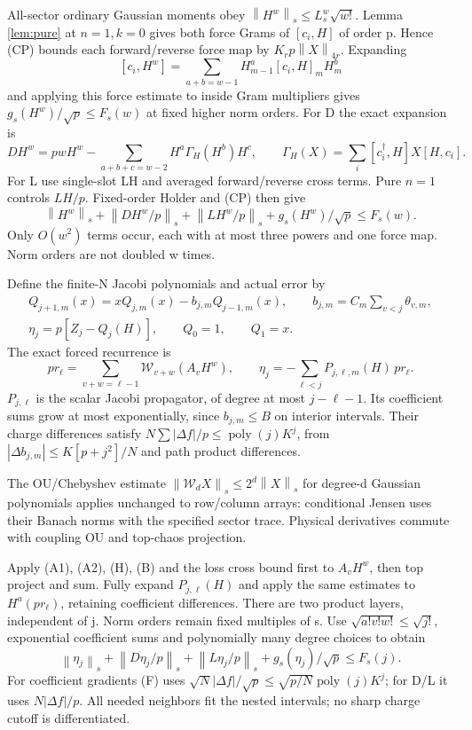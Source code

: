 \documentclass[11pt]{article}
\newcommand{\Wick}{\mathcal W}
\newcommand{\norm}[1]{\left\lVert#1\right\rVert}
\begin{document}
All-sector ordinary Gaussian moments obey
$\norm{H^w}_s\le L_s^w\sqrt{w!}$. Lemma \ref{lem:pure} at
$n=1,k=0$ gives both force Grams of $[c_i,H]$ of order p.
Hence (CP) bounds each forward/reverse force map by
$K_rp\norm X_{4r}$. Expanding
\[
 [c_i,H^w]=\sum_{a+b=w-1}H_{m-1}^a[c_i,H]_mH_m^b
\]
and applying this force estimate to inside Gram multipliers
gives $g_s(H^w)/\sqrt p\le F_s(w)$ at fixed higher norm orders.
For D the exact expansion is
\[
 DH^w=pwH^w-\sum_{a+b+c=w-2}H^a\Gamma_H(H^b)H^c,\qquad
 \Gamma_H(X)=\sum_i[c_i^\dagger,H]X[H,c_i].
\]
For L use single-slot LH and averaged forward/reverse cross
terms. Pure $n=1$ controls $LH/p$. Fixed-order Holder and (CP)
then give
\[
 \norm{H^w}_s+\norm{DH^w/p}_s+\norm{LH^w/p}_s
              +g_s(H^w)/\sqrt p\le F_s(w). \tag{H}
\]
Only $O(w^2)$ terms occur, each with at most three powers and
one force map. Norm orders are not doubled w times.

Define the finite-N Jacobi polynomials and actual error by
\begin{gather*}
 Q_{j+1,m}(x)=xQ_{j,m}(x)-b_{j,m}Q_{j-1,m}(x),
 \qquad b_{j,m}=C_m\sum_{v<j}\theta_{v,m},\\
 \eta_j=p[Z_j-Q_j(H)],\qquad Q_0=1,\qquad Q_1=x.
\end{gather*}
The exact forced recurrence \cite{charged} is
\[
 p r_\ell=\sum_{v+w=\ell-1}\Wick_{v+w}(A_vH^w),\qquad
 \eta_j=-\sum_{\ell<j}P_{j,\ell,m}(H)\,p r_\ell. \tag{J}
\]
$P_{j,\ell}$ is the scalar Jacobi propagator, of degree at most
$j-\ell-1$. Its coefficient sums grow at most exponentially,
since $b_{j,m}\le B$ on interior intervals. Their charge
differences satisfy
$N\sum|\Delta f|/p\le\operatorname{poly}(j)K^j$, from
$|\Delta b_{j,m}|\le K[p+j^2]/N$ and path product differences.

The OU/Chebyshev estimate
$\norm{\Wick_dX}_s\le2^d\norm X_s$ for degree-d Gaussian
polynomials \cite{operator} applies unchanged to row/column
arrays: conditional Jensen uses their Banach norms with the
specified sector trace. Physical derivatives commute with
coupling OU and top-chaos projection.

Apply (A1), (A2), (H), (B) and the loss cross bound first to
$A_vH^w$, then top project and sum. Fully expand $P_{j,\ell}(H)$
and apply the same estimates to $H^a(p r_\ell)$, retaining
coefficient differences. There are two product layers,
independent of j. Norm orders remain fixed multiples of s.
Use $\sqrt{a!v!w!}\le\sqrt{j!}$, exponential coefficient
sums and polynomially many degree choices to obtain
\[
 \norm{\eta_j}_s+\norm{D\eta_j/p}_s+\norm{L\eta_j/p}_s
               +g_s(\eta_j)/\sqrt p\le F_s(j). \tag{E}
\]
For coefficient gradients (F) uses
$\sqrt N|\Delta f|/\sqrt p\le\sqrt{p/N}\operatorname{poly}(j)K^j$;
for D/L it uses $N|\Delta f|/p$. All needed neighbors fit the
nested intervals; no sharp charge cutoff is differentiated.
\end{document}
